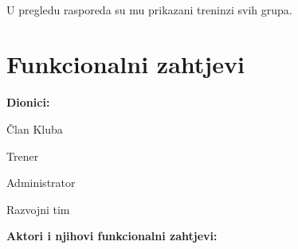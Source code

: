 \documentclass[times, utf8, zavrsni]{fer}
\newenvironment{packed_enum}{
	\begin{enumerate}
		\setlength{\itemsep}{0pt}
		\setlength{\parskip}{0pt}
		\setlength{\parsep}{0pt}
	}{\end{enumerate}}
\begin{document}
		\\U pregledu rasporeda su mu prikazani treninzi svih grupa.
		
		\pagebreak
		
		\section{Funkcionalni zahtjevi}		
			
			\noindent \textbf{Dionici:}
			
			\begin{packed_enum}
				
				\item Član Kluba
				\item Trener				
				\item Administrator
				\item Razvojni tim
				
			\end{packed_enum}
			
			\noindent \textbf{Aktori i njihovi funkcionalni zahtjevi:}
			
\end{document}
